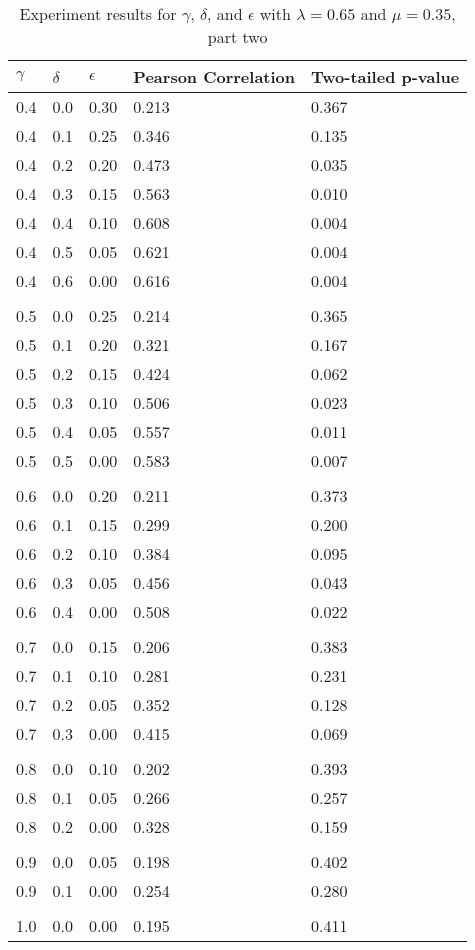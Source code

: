 \documentclass{article}
\begin{document}
\begin{table}[h!]
\caption{Experiment results for $\gamma$, $\delta$, and $\epsilon$ with $\lambda = 0.65$ and $\mu = 0.35$, part two}
\centering
\begin{tabular}{lllll}
	\toprule
	$\gamma$ & $\delta$ & $\epsilon$ & Pearson Correlation & Two-tailed p-value \\
	\midrule
	0.4 & 0.0 & 0.30 & 0.213 & 0.367 \\
	0.4 & 0.1 & 0.25 & 0.346 & 0.135 \\
	0.4 & 0.2 & 0.20 & 0.473 & 0.035 \\
	0.4 & 0.3 & 0.15 & 0.563 & 0.010 \\
	0.4 & 0.4 & 0.10 & 0.608 & 0.004 \\
	0.4 & 0.5 & 0.05 & 0.621 & 0.004 \\
	0.4 & 0.6 & 0.00 & 0.616 & 0.004 \\
		&&&& \\
	0.5 & 0.0 & 0.25 & 0.214 & 0.365 \\
	0.5 & 0.1 & 0.20 & 0.321 & 0.167 \\
	0.5 & 0.2 & 0.15 & 0.424 & 0.062 \\
	0.5 & 0.3 & 0.10 & 0.506 & 0.023 \\
	0.5 & 0.4 & 0.05 & 0.557 & 0.011 \\
	0.5 & 0.5 & 0.00 & 0.583 & 0.007 \\
		&&&& \\
	0.6 & 0.0 & 0.20 & 0.211 & 0.373 \\
	0.6 & 0.1 & 0.15 & 0.299 & 0.200 \\
	0.6 & 0.2 & 0.10 & 0.384 & 0.095 \\
	0.6 & 0.3 & 0.05 & 0.456 & 0.043 \\
	0.6 & 0.4 & 0.00 & 0.508 & 0.022 \\
		&&&& \\
	0.7 & 0.0 & 0.15 & 0.206 & 0.383 \\
	0.7 & 0.1 & 0.10 & 0.281 & 0.231 \\
	0.7 & 0.2 & 0.05 & 0.352 & 0.128 \\
	0.7 & 0.3 & 0.00 & 0.415 & 0.069 \\
		&&&& \\
	0.8 & 0.0 & 0.10 & 0.202 & 0.393 \\
	0.8 & 0.1 & 0.05 & 0.266 & 0.257 \\
	0.8 & 0.2 & 0.00 & 0.328 & 0.159 \\
		&&&& \\
	0.9 & 0.0 & 0.05 & 0.198 & 0.402 \\
	0.9 & 0.1 & 0.00 & 0.254 & 0.280 \\
		&&&& \\
	1.0 & 0.0 & 0.00 & 0.195 & 0.411 \\
	\bottomrule
\end{tabular}
\label{table:gammaresults2}
\end{table}
\end{document}
